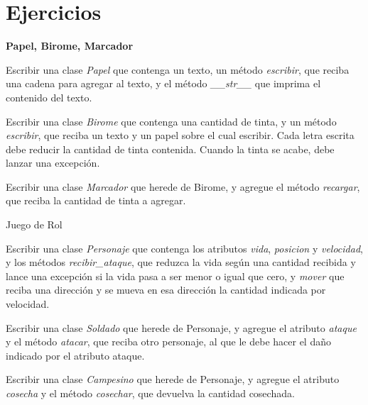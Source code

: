 \newpage
\section{Ejercicios}

\begin{ejercicio}
{\bf Papel, Birome, Marcador}
\begin{partes}
    \item Escribir una clase {\it Papel} que contenga un texto, un método {\it
escribir}, que reciba una cadena para agregar al texto, y el método {\it
\_\_str\_\_} que imprima el contenido del texto.
    \item Escribir una clase {\it Birome} que contenga una cantidad de tinta, y
un método {\it escribir}, que reciba un texto y un papel sobre el cual
escribir. Cada letra escrita debe reducir la cantidad de tinta contenida.
Cuando la tinta se acabe, debe lanzar una excepción.
    \item Escribir una clase {\it Marcador} que herede de Birome, y agregue el
método {\it recargar}, que reciba la cantidad de tinta a agregar.
\end{partes}
\end{ejercicio}


\begin{ejercicio}
Juego de Rol
\begin{partes}
    \item Escribir una clase {\it Personaje} que contenga los atributos {\it
vida}, {\it posicion} y {\it velocidad}, y los métodos {\it
recibir\_ataque}, que reduzca la vida según una cantidad recibida y lance
una excepción si la vida pasa a ser menor o igual que cero, y {\it
mover} que reciba una dirección y se mueva en esa dirección la cantidad
indicada por velocidad.
    \item Escribir una clase {\it Soldado} que herede de Personaje, y agregue
el atributo {\it ataque} y el método {\it atacar}, que reciba otro
personaje, al que le debe hacer el daño indicado por el atributo ataque.
    \item Escribir una clase {\it Campesino} que herede de Personaje, y agregue
el atributo {\it cosecha} y el método {\it cosechar}, que devuelva la
cantidad cosechada.
\end{partes}
\end{ejercicio}

